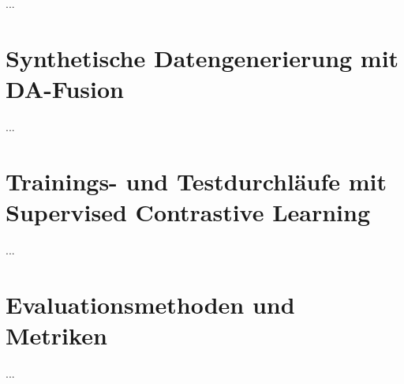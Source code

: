 ...

\section{Synthetische Datengenerierung mit DA-Fusion} \label{sec:synt-gen-da-fusion}

...

\section{Trainings- und Testdurchläufe mit Supervised Contrastive Learning} \label{sec:train-test-supcon}

...

\section{Evaluationsmethoden und Metriken} \label{sec:evaluation}

...


